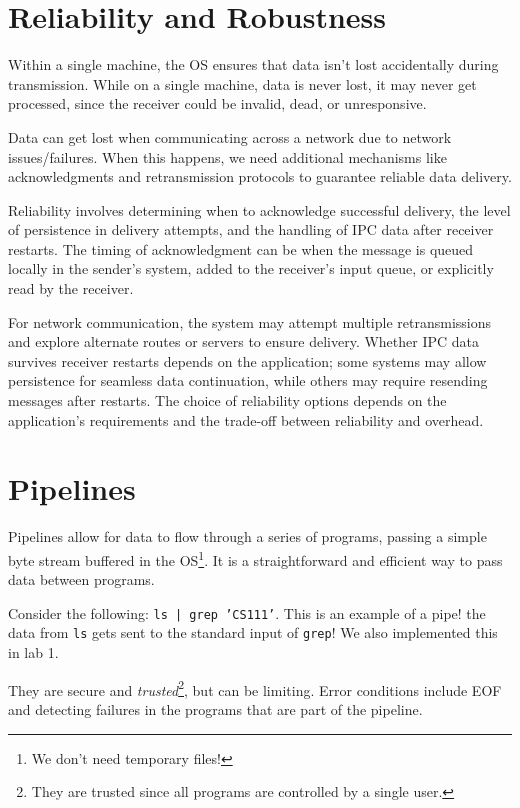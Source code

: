 \documentclass{report}
\newcommand{\exampleBegin}[1]{\begin{tcolorbox}[colback=blue!5!white,colframe=black!75!blue,title={Example:
      #1}]}
\newcommand{\exampleEnd}{\end{tcolorbox}}
\begin{document}
\section{Reliability and Robustness}
Within a single machine, the OS ensures that data isn't lost accidentally during
transmission. While on a single machine, data is never lost, it may never get processed, since the
receiver could be invalid, dead, or unresponsive.

Data can get lost when communicating across a network due to network issues/failures. When this
happens, we need additional mechanisms like acknowledgments and retransmission protocols to
guarantee reliable data delivery.

Reliability involves determining when to acknowledge successful delivery, the level of persistence
in delivery attempts, and the handling of IPC data after receiver restarts. The timing of
acknowledgment can be when the message is queued locally in the sender's system, added to the
receiver's input queue, or explicitly read by the receiver. 

For network communication, the system may attempt multiple retransmissions and explore alternate routes or
servers to ensure delivery. Whether IPC data survives receiver restarts depends on the application;
some systems may allow persistence for seamless data continuation, while others may require
resending messages after restarts. The choice of reliability options depends on the application's
requirements and the trade-off between reliability and overhead. 

    
\section{Pipelines}
Pipelines allow for data to flow through a series of programs, passing a simple byte stream buffered
in the OS\footnote{We don't need temporary files!}. It is a straightforward and efficient way to
pass data between programs.

\exampleBegin{Pipe Up!}
Consider the following: \texttt{ls | grep 'CS111'}. This is an example of a pipe! the data from
\texttt{ls} gets sent to the standard input of \texttt{grep}! We also implemented this in lab 1.
\exampleEnd

They are secure and \textit{trusted}\footnote{They are trusted since all programs are controlled by
  a single user.}, but can be limiting. Error conditions include EOF and detecting failures in the
programs that are part of the pipeline.
\end{document}
